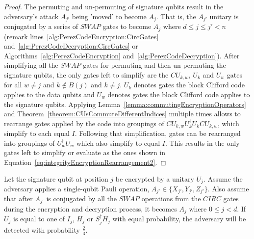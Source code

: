 \begin{proof}
The permuting and un-permuting of signature qubits result in the adversary's attack $A_{j'}$ being 'moved' to become $A_j$. That is, the $A_{j'}$ unitary is conjugated by a series of $\mathit{SWAP}$ gates to become $A_{j}$ where $d \leq j \leq j' < n$ (remark lines~\ref{alg:PerezCodeEncryption:CircGates} and~\ref{alg:PerezCodeDecryption:CircGates} or Algorithms~\ref{alg:PerezCodeEncryption} and~\ref{alg:PerezCodeDecryption}). After simplifying all the $\mathit{SWAP}$ gates for permuting and then un-permuting the signature qubits, the only gates left to simplify are the $\mathit{CU}_{k,w}$, $U_k$ and $U_w$ gates for all $w \neq j$ and $k \notin B(j)$ and $k \neq j$. $U_k$ denotes gates the block Clifford code applies to the data qubits and $U_w$ denotes gates the block Clifford code applies to the signature qubits. Applying Lemma~\ref{lemma:commutingEncryptionOperators} and Theorem~\ref{theorem:CUsCommuteDifferentIndices} multiple times allows to rearrange gates applied by the code into groupings of  $\mathit{CU}_{k,w}U_k^{\dagger}U_k\mathit{CU}_{k,w}$, which simplify to each equal $I$.  Following that simplification, gates can be rearranged into groupings of $U_w^{\dagger}U_w$ which also simplify to equal $I$. This results in the only gates left to simplify or evaluate as the ones shown in Equation~\eqref{eq:integrityEncryptionRearrangement2}.
\end{proof}
\begin{theorem}
\label{theorem:singleQubitAttackOnSignatureQubit}
Let the signature qubit at position $j$ be encrypted by a unitary $U_j$. Assume the adversary applies a single-qubit Pauli operation, $A_{j'} \in \{X_{j'}, Y_{j'}, Z_{j'}\}$. Also assume that after $A_{j'}$ is conjugated by all the $\mathit{SWAP}$ operations from the $\mathit{CIRC}$ gates during the encryption and decryption process, it becomes $A_j$ where $0 \leq j < d$. If $U_j$ is equal to one of $I_j$, $H_j$ or $S_j^{\dagger}H_j$ with equal probability, the adversary will be detected with probability $\frac{2}{3}$.
\end{theorem}
